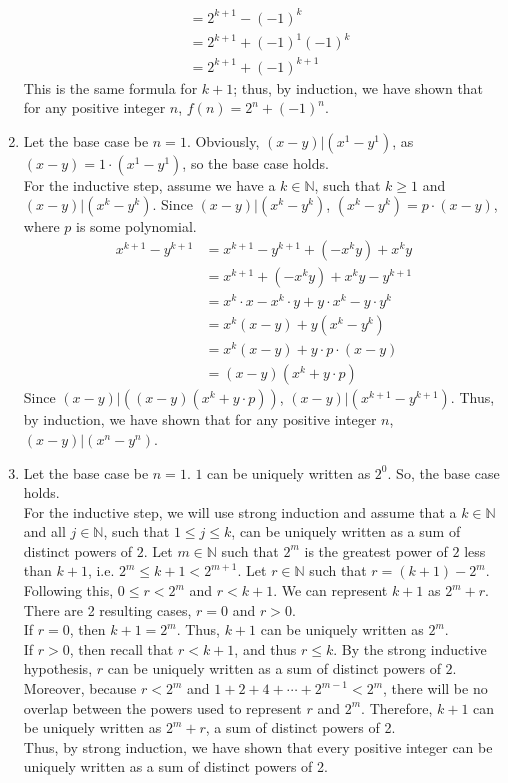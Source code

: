 \documentclass{article}
\begin{document}
\begin{enumerate}[label=\textbf{\arabic*}.]
\begin{align*}
        &=2^{k+1}-(-1)^{k}\\
        &=2^{k+1}+(-1)^1(-1)^{k}\\
        &=2^{k+1}+(-1)^{k+1}
    \end{align*}
    This is the same formula for $k+1$; thus, by induction, we have shown that for any positive integer $n$, $f(n)=2^n+(-1)^n$.
    \item Let the base case be $n=1$. Obviously, $(x-y)|(x^1-y^1)$, as $(x-y)=1\cdot(x^1-y^1)$, so the base case holds.\\
    For the inductive step, assume we have a $k\in\mathbb{N}$, such that $k\geq1$ and $(x-y)|(x^k-y^k)$. Since $(x-y)|(x^k-y^k)$, $(x^k-y^k)=p\cdot(x-y)$, where $p$ is some polynomial.
    \begin{align*}
        x^{k+1}-y^{k+1}&=x^{k+1}-y^{k+1}+(-x^ky)+x^ky\\
        &=x^{k+1}+(-x^ky)+x^ky-y^{k+1}\\
        &=x^{k}\cdot x-x^k\cdot y+y\cdot x^k-y\cdot y^{k}\\
        &=x^{k}(x-y)+y(x^k-y^{k})\\
        &=x^{k}(x-y)+y\cdot p\cdot(x-y)\\
        &=(x-y)(x^{k}+y\cdot p)
    \end{align*}
    Since $(x-y)|((x-y)(x^{k}+y\cdot p))$, $(x-y)|(x^{k+1}-y^{k+1})$. Thus, by induction, we have shown that for any positive integer $n$, $(x-y)|(x^n-y^n)$.
    \item Let the base case be $n=1$. $1$ can be uniquely written as $2^0$. So, the base case holds.\\
    For the inductive step, we will use strong induction and assume that a $k\in\mathbb{N}$ and all $j\in\mathbb{N}$, such that $1\leq j\leq k$, can be uniquely written as a sum of distinct powers of $2$. Let $m\in\mathbb{N}$ such that $2^m$ is the greatest power of $2$ less than $k+1$, i.e. $2^m\leq k+1 <2^{m+1}$. Let $r\in\mathbb{N}$ such that $r=(k+1)-2^m$. Following this, $0\leq r<2^m$ and $r<k+1$. We can represent $k+1$ as $2^m+r$. There are 2 resulting cases, $r=0$ and $r>0$.\\
     If $r=0$, then $k+1=2^m$. Thus, $k+1$ can be uniquely written as $2^m$.\\
     If $r>0$, then recall that $r<k+1$, and thus $r\leq k$. By the strong inductive hypothesis, $r$ can be uniquely written as a sum of distinct powers of $2$. Moreover, because $r<2^m$ and $1+2+4+\cdots+2^{m-1}<2^{m}$, there will be no overlap between the powers used to represent $r$ and $2^m$. Therefore, $k+1$ can be uniquely written as $2^m+r$, a sum of distinct powers of 2.\\
    Thus, by strong induction, we have shown that every positive integer can be uniquely written as a sum of distinct powers of 2.
\end{enumerate}
\end{document}
